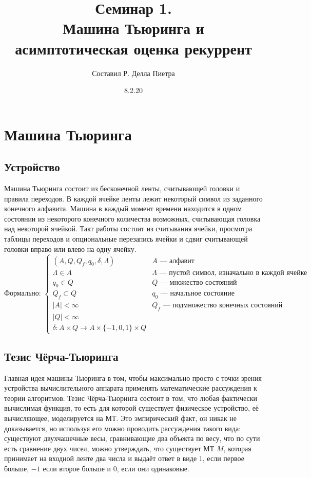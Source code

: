 \documentclass{article}
\title{Семинар 1. \\ Машина Тьюринга и асимптотическая оценка рекуррент}
\author{Составил Р. Делла Пиетра}
\date{8.2.20}
\begin{document}
\maketitle
\section{Машина Тьюринга}
\subsection{Устройство}
Машина Тьюринга состоит из бесконечной ленты, считывающей головки и правила переходов. В каждой ячейке ленты лежит некоторый символ из заданного конечного алфавита. Машина в каждый момент времени находится в одном состоянии из некоторого конечного количества возможных, считывающая головка над некоторой ячейкой. Такт работы состоит из считывания ячейки, просмотра таблицы переходов и опциональные перезапись ячейки и сдвиг считывающей головки вправо или влево на одну ячейку. \\
\[
\text{Формально: }
\left\{ \begin{array}{cl}
(A, Q, Q_f, q_0, \delta, \Lambda) & A\textit{~---~алфавит }\\
\Lambda \in A  & \Lambda \textit{~---~пустой символ, изначально в каждой ячейке ленты} \\
q_0 \in Q  & Q\textit{~---~множество состояний}\\
Q_f \subset Q  & q_0\textit{~---~начальное состояние} \\
|A| < \infty  & Q_f\textit{~---~подмножество конечных состояний} \\
|Q| < \infty \\
\delta: A \times Q \rightarrow A \times \{-1, 0 ,1\} \times Q
\end{array} \right.
\] 
\subsection{Тезис Чёрча-Тьюринга}
Главная идея машины Тьюринга в том, чтобы максимально просто с точки зрения устройства вычислительного аппарата применять математические рассуждения к теории алгоритмов. Тезис Чёрча-Тьюринга состоит в том, что любая фактически вычислимая функция, то есть для которой существует физическое устройство, её вычисляющее, моделируется на МТ. Это эмпирический факт, он никак не доказывается, но используя его можно проводить рассуждения такого вида: существуют двухчашечные весы, сравнивающие два объекта по весу, что по сути есть сравнение двух чисел, можно утверждать, что существует МТ $M$, которая принимает на входной ленте два числа и выдаёт ответ в виде $1$, если первое больше, $-1$ если второе больше и $0$, если они одинаковые. 
\end{document}
